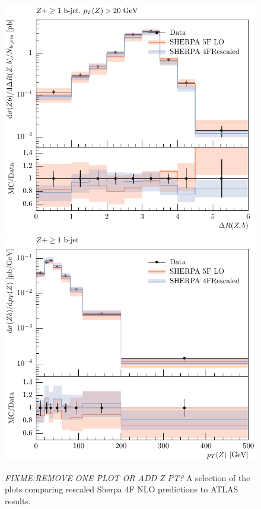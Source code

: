 \documentclass[11pt]{cernrep}
\begin{document}
\begin{figure}[htbp]
\begin{center}
   \includegraphics[scale=0.65]{figs/zbb/sherpa/d13-x01-y01_rescaled.pdf} 
   \includegraphics[scale=0.65]{figs/zbb/sherpa/d15-x01-y01_rescaled.pdf}
\caption{{\em FIXME:REMOVE ONE PLOT OR ADD Z PT?} A selection of the plots
  comparing rescaled Sherpa 4F NLO predictions to ATLAS results.}
\label{zbb-sherpa-scaled}
\end{center}
\end{figure}
\end{document}
